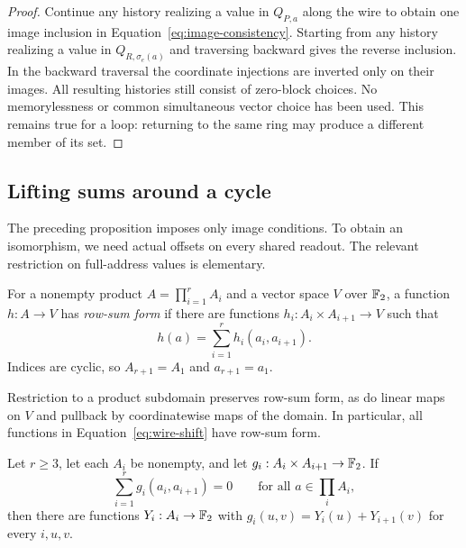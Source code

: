 \begin{proof}
Continue any history realizing a value in $Q_{P,a}$ along the wire
to obtain one image inclusion in
Equation~\eqref{eq:image-consistency}. Starting from any history
realizing a value in $Q_{R,\sigma_e(a)}$ and traversing backward
gives the reverse inclusion. In the backward traversal the
coordinate injections are inverted only on their images. All
resulting histories still consist of zero-block choices.
No memorylessness or common simultaneous vector choice has been
used. This remains true for a loop: returning to the same ring
may produce a different member of its set.
\end{proof}

\subsection{Lifting sums around a cycle}

The preceding proposition imposes only image conditions. To obtain
an isomorphism, we need actual offsets on every shared readout.
The relevant restriction on full-address values is elementary.

\begin{definition}
For a nonempty product $A=\prod_{i=1}^r A_i$ and a vector space $V$
over $\mathbb F_2$, a function $h:A\to V$ has \emph{row-sum form} if there
are functions $h_i:A_i\times A_{i+1}\to V$ such that
\begin{equation}
                 h(a)=\sum_{i=1}^r h_i(a_i,a_{i+1}).
 \label{eq:row-sum}
\end{equation}
Indices are cyclic, so $A_{r+1}=A_1$ and $a_{r+1}=a_1$.
\end{definition}

Restriction to a product subdomain preserves row-sum form, as do
linear maps on $V$ and pullback by coordinatewise maps of the
domain. In particular, all functions in
Equation~\eqref{eq:wire-shift} have row-sum form.

\begin{lemma}
\label{lem:cycle-lifting}
Let $r\ge3$, let each $A_i$ be nonempty, and let
$g_i:A_i\times A_{i+1}\to\mathbb F_2$. If
\begin{equation}
                \sum_{i=1}^r g_i(a_i,a_{i+1})=0
                \qquad\text{for all }a\in\prod_i A_i,
 \label{eq:zero-cycle-sum}
\end{equation}
then there are functions $Y_i:A_i\to\mathbb F_2$ with
$g_i(u,v)=Y_i(u)+Y_{i+1}(v)$ for every $i,u,v$.
\end{lemma}

